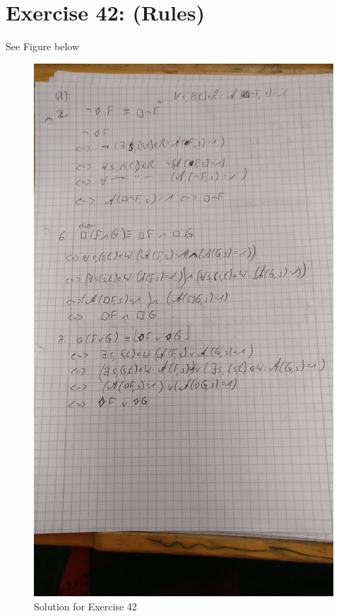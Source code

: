 \documentclass[12pt]{article}
\begin{document}
\section*{Exercise 42: (Rules)}

See Figure below

\begin{figure}[ht]
	\includegraphics[scale=0.1475]{../pics/42.jpeg}
	\caption{Solution for Exercise 42}
\end{figure}
\end{document}
